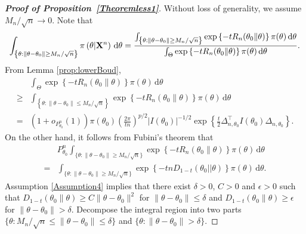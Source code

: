 \documentclass[11pt]{article}
\theoremstyle{plain}
\theoremstyle{definition}
\theoremstyle{remark}
\begin{document}
\begin{appendices}
\begin{proof}[\textbf{Proof of Proposition~\ref{Theoremless1}}]
    Without loss of generality, we assume ${M_n}/{\sqrt{n}}\to 0$.
    Note that
    \begin{align*}
        \int_{ \left\{ \theta: \|\theta -\theta_0\|\geq M_n /\sqrt n \right\}}\pi\left( \theta |  \mathbf{X}^n \right)  \, \mathrm d \theta
        =
        \frac{
            \int_{ \left\{ \theta: \|\theta -\theta_0\|\geq M_n /\sqrt n \right\}}
    \exp\left\{  -t R_n (\theta_0 \| \theta) \right\} \pi(\theta) \, \mathrm d \theta
        }{
            \int_{ \Theta }
    \exp\left\{  -t R_n (\theta_0 \| \theta) \right\} \pi(\theta) \, \mathrm d \theta
}.
    \end{align*}
    From Lemma \ref{prop:lowerBoud},
    \begin{equation}
\label{deadline2:1}
    \begin{aligned}
            &
            \int_{ \Theta }
    \exp\left\{  -t R_n (\theta_0 \| \theta) \right\} \pi(\theta) \, \mathrm d \theta
    \\
\geq&
    \int_{\left\{ \theta: \|\theta - \theta_0\| \leq M_n/\sqrt n \right\}}
    \exp\left\{-t R_n(\theta_0\| \theta) \right\} \pi(\theta)
\, \mathrm d \theta
\\
=&
    (1+o_{P^n_{\theta_0}}(1))
    \pi(\theta_0)
    \left(\frac{2\pi}{t n}\right)^{{p}/{2}}
    |I(\theta_0)|^{-{1}/{2}} 
    \exp
    \left\{ 
        \frac{t}{2}\Delta_{n,\theta_0}^\top  I({\theta_0})\Delta_{n,\theta_0}
\right\}
    .
        \end{aligned}
    \end{equation}
    On the other hand, it follows from Fubini's theorem that
\begin{align*}
    &P_{\theta_0}^n\int_{\{\theta:\|\theta-\theta_0\|\geq {M_n}/{\sqrt{n}}\} }
    \exp\left\{  -t R_n (\theta_0 \| \theta) \right\} \pi(\theta) \, \mathrm d \theta
    \\
    =& 
    \int_{\{\theta:\|\theta-\theta_0\|\geq {M_n}/{\sqrt{n}}\} } \exp \left\{-t n D_{1-t}(\theta_0||\theta) \right\} \pi(\theta) \, \mathrm d \theta.
\end{align*}
Assumption \ref{Assumption4} implies that there exist $\delta >0$, $C >0$ and $\epsilon > 0$ such that $D_{1-t}(\theta_0 \| \theta) \geq C \| \theta - \theta_0\|^2 $ for $\|\theta - \theta_0\| \leq \delta$ and $D_{1-t}(\theta_0 \| \theta)\geq \epsilon$ for $\|\theta - \theta_0\| >\delta$.
    Decompose the integral region into two parts $\{\theta:{M_n}/{\sqrt{n}}\leq \|\theta-\theta_0\|\leq \delta \}$ and $\{\theta: \|\theta-\theta_0\|>\delta\}$.

\end{proof}
\end{appendices}
\end{document}
